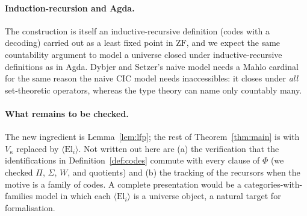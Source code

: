 \documentclass[10pt]{article}
\newcommand{\CIC}{\mathrm{CIC}}
\newcommand{\ZF}{\mathrm{ZF}}
\newcommand{\El}{\mathrm{El}}
\begin{document}
\paragraph{Induction-recursion and Agda.}
The construction is itself an inductive-recursive definition (codes with a
decoding) carried out as a least fixed point in $\ZF$, and we expect the
same countability argument to model a universe closed under
inductive-recursive definitions as in Agda. Dybjer and Setzer's naive model
needs a Mahlo cardinal \cite{dybjersetzer99} for the same reason the naive
$\CIC$ model needs inaccessibles: it closes under \emph{all} set-theoretic
operators, whereas the type theory can name only countably many.

\paragraph{What remains to be checked.}
The new ingredient is Lemma~\ref{lem:lfp}; the rest of
Theorem~\ref{thm:main} is \cite{werner97,miquelwerner02,leewerner11,
vdbergotten23} with $V_\kappa$ replaced by $\langle\El_i\rangle$. Not
written out here are (a) the verification that the identifications in
Definition~\ref{def:codes} commute with every clause of $\Phi$ (we checked
$\Pi$, $\Sigma$, $W$, and quotients) and (b) the tracking of the recursors
when the motive is a family of codes. A complete presentation would be a categories-with-families
model in which each $\langle\El_i\rangle$ is a universe object, a natural
target for formalisation.

{\small

}
\end{document}
